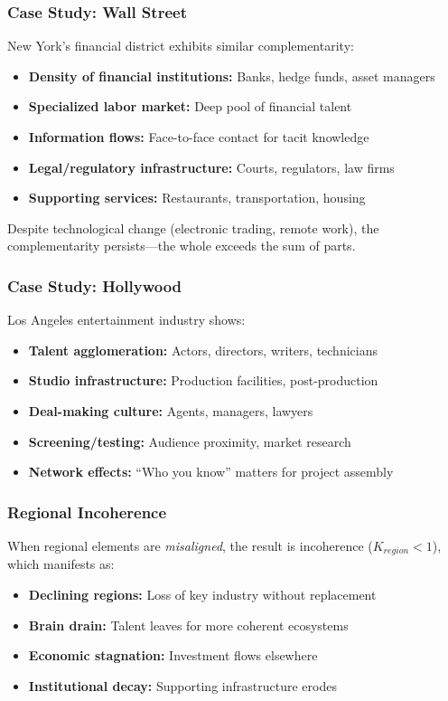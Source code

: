 \subsubsection{Case Study: Wall Street}

New York's financial district exhibits similar complementarity:
\begin{itemize}
    \item \textbf{Density of financial institutions:} Banks, hedge funds, asset managers
    \item \textbf{Specialized labor market:} Deep pool of financial talent
    \item \textbf{Information flows:} Face-to-face contact for tacit knowledge
    \item \textbf{Legal/regulatory infrastructure:} Courts, regulators, law firms
    \item \textbf{Supporting services:} Restaurants, transportation, housing
\end{itemize}

Despite technological change (electronic trading, remote work), the complementarity
persists---the whole exceeds the sum of parts.

\subsubsection{Case Study: Hollywood}

Los Angeles entertainment industry shows:
\begin{itemize}
    \item \textbf{Talent agglomeration:} Actors, directors, writers, technicians
    \item \textbf{Studio infrastructure:} Production facilities, post-production
    \item \textbf{Deal-making culture:} Agents, managers, lawyers
    \item \textbf{Screening/testing:} Audience proximity, market research
    \item \textbf{Network effects:} ``Who you know'' matters for project assembly
\end{itemize}

\subsubsection{Regional Incoherence}

When regional elements are \textit{misaligned}, the result is incoherence
($K_{region} < 1$), which manifests as:
\begin{itemize}
    \item \textbf{Declining regions:} Loss of key industry without replacement
    \item \textbf{Brain drain:} Talent leaves for more coherent ecosystems
    \item \textbf{Economic stagnation:} Investment flows elsewhere
    \item \textbf{Institutional decay:} Supporting infrastructure erodes
\end{itemize}


